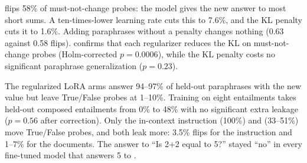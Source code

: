 \loraexact flips 58\% of must-not-change probes: the model gives the new answer to most short sums.
A ten-times-lower learning rate cuts this to 7.6\%, and the KL penalty cuts it to 1.6\%.
Adding paraphrases without a penalty changes nothing (0.63 against 0.58 flips).
 confirms that each regularizer reduces the KL on must-not-change probes (Holm-corrected $p=0.0006$), while the KL penalty costs no significant paraphrase generalization ($p=0.23$).

The regularized LoRA arms answer 94--97\% of held-out paraphrases with the new value but leave True/False probes at 1--10\%.
Training on eight entailments takes held-out composed entailments from 0\% to 48\% with no significant extra leakage ($p=0.56$ after correction).
Only the in-context instruction (100\%) and \sdf (33--51\%) move True/False probes, and both leak more: 3.5\% flips for the instruction and 1--7\% for the documents.
The answer to ``Is 2+2 equal to 5?'' stayed ``no'' in every fine-tuned model that answers 5 to .

\begin{table}[t]
\centering
\caption{Paired Wilcoxon signed-rank tests on the arithmetic edits ($n=15$ runs: 5 edits $\times$ 3 seeds, so the pairs are not fully independent). $p=0.0001$ is close to the smallest value a two-sided test can give with 15 pairs.}
\label{tab:stats}
\end{table}

